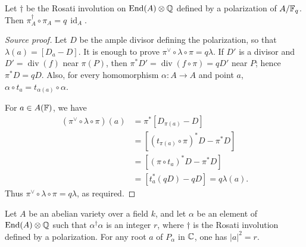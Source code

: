 \begin{lemma}\label{lem:milne-rosati-frobenius}
Let $\dagger$ be the Rosati involution on $\operatorname{End}(A)\otimes\mathbb{Q}$ defined by a
polarization of $A/\mathbb{F}_q$. Then
$\pi_A^\dagger\circ\pi_A=q\,\operatorname{id}_A$.
\end{lemma}

\begin{proof}[Source proof]
Let $D$ be the ample divisor defining the polarization, so that
$\lambda(a)=[D_a-D]$. It is enough to prove
$\pi^\vee\circ\lambda\circ\pi=q\lambda$. If $D'$ is a divisor and
$D'=\operatorname{div}(f)$ near $\pi(P)$, then
$\pi^*D'=\operatorname{div}(f\circ\pi)=qD'$ near $P$; hence
$\pi^*D=qD$. Also, for every homomorphism $\alpha:A\to A$ and point $a$,
$\alpha\circ t_a=t_{\alpha(a)}\circ\alpha$.

For $a\in A(\mathbb{F})$, we have
\[
\begin{aligned}
 (\pi^\vee\circ\lambda\circ\pi)(a)
 &=\pi^*[D_{\pi(a)}-D] \\
 &=[(t_{\pi(a)}\circ\pi)^*D-\pi^*D] \\
 &=[(\pi\circ t_a)^*D-\pi^*D] \\
 &=[t_a^*(qD)-qD]=q\lambda(a).
\end{aligned}
\]
Thus $\pi^\vee\circ\lambda\circ\pi=q\lambda$, as required.
\end{proof}

\begin{lemma}\label{lem:milne-rosati-eigenvalues}
Let $A$ be an abelian variety over a field $k$, and let $\alpha$ be an
element of $\operatorname{End}(A)\otimes\mathbb{Q}$ such that $\alpha^\dagger\alpha$ is an integer
$r$, where $\dagger$ is the Rosati involution defined by a polarization.  For
any root $a$ of $P_\alpha$ in $\mathbb{C}$, one has $|a|^2=r$.
\end{lemma}


